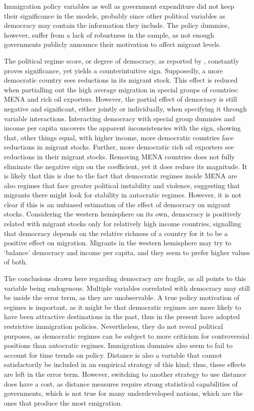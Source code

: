 \documentclass[../main.tex]{subfiles}
\begin{document}
Immigration policy variables as well as government expenditure did not keep their significance in the models, probably since other political variables as democracy may contain the information they include. The policy dummies, however, suffer from a lack of robustness in the sample, as not enough governments publicly announce their motivation to affect migrant levels.

The political regime score, or degree of democracy, as reported by \textcite{OurWorldInData.2015}, constantly proves significance, yet yields a counterintuitive sign. Supposedly, a more democratic country sees reductions in its migrant stock. This effect is reduced when partialling out the high average migration in special groups of countries: MENA and rich oil exporters. However, the partial effect of democracy is still negative and significant, either jointly or individually, when specifying it through variable interactions. Interacting democracy with special group dummies and income per capita uncovers the apparent inconsistencies with the sign, showing that, other things equal, with higher income, more democratic countries face reductions in migrant stocks. Further, more democratic rich oil exporters see reductions in their migrant stocks. Removing MENA countries does not fully eliminate the negative sign on the coefficient, yet it does reduce its magnitude. It is likely that this is due to the fact that democratic regimes inside MENA are also regimes that face greater political instability and violence, suggesting that migrants there might look for stability in autocratic regimes. However, it is not clear if this is an unbiased estimation of the effect of democracy on migrant stocks. Considering the western hemisphere on its own, democracy is positively related with migrant stocks only for relatively high income countries, signalling that democracy depends on the relative richness of a country for it to be a positive effect on migration. Migrants in the western hemisphere may try to ‘balance’ democracy and income per capita, and they seem to prefer higher values of both. 

The conclusions drawn here regarding democracy are fragile, as all points to this variable being endogenous. Multiple variables correlated with democracy may still be inside the error term, as they are unobservable. A true policy motivation of regimes is important, as it might be that democratic regimes are more likely to have been attractive destinations in the past, thus in the present have adopted restrictive immigration policies. Nevertheless, they do not reveal political purposes, as democratic regimes can be subject to more criticism for controversial positions than autocratic regimes. Immigration dummies also seem to fail to account for time trends on policy. Distance is also a variable that cannot satisfactorily be included in an empirical strategy of this kind; thus, these effects are left in the error term. However, switching to another strategy to use distance does have a cost, as distance measures require strong statistical capabilities of governments, which is not true for many underdeveloped nations, which are the ones that produce the most emigration.
\end{document}
